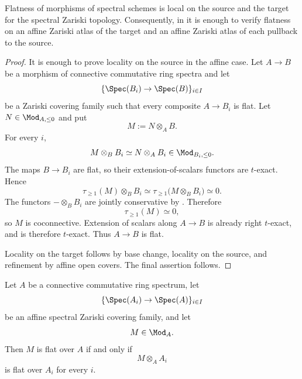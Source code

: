 \begin{proposition}
\label{prop:global-flatness-zariski-local}
Flatness of morphisms of spectral schemes is local on the source and the
target for the spectral Zariski topology. Consequently, in
 it is enough to verify flatness on
an affine Zariski atlas of the target and an affine Zariski atlas of each
pullback to the source.
\end{proposition}

\begin{proof}
It is enough to prove locality on the source in the affine case. Let
$A\to B$ be a morphism of connective commutative ring spectra and let
\[
    \{\Spec(B_i)\to\Spec(B)\}_{i\in I}
\]
be a Zariski covering family such that every composite $A\to B_i$ is
flat. Let $N\in\Mod_{A,\leq0}$ and put
\[
    M
    :=
    N\otimes_AB.
\]
For every $i$,
\[
    M\otimes_BB_i
    \simeq
    N\otimes_AB_i
    \in
    \Mod_{B_i,\leq0}.
\]
The maps $B\to B_i$ are flat, so their extension-of-scalars functors are
$t$-exact. Hence
\[
    \tau_{\geq1}(M)\otimes_BB_i
    \simeq
    \tau_{\geq1}
    \bigl(
        M\otimes_BB_i
    \bigr)
    \simeq
    0.
\]
The functors $-\otimes_BB_i$ are jointly conservative by
. Therefore
\[
    \tau_{\geq1}(M)
    \simeq
    0,
\]
so $M$ is coconnective. Extension of scalars along $A\to B$ is already
right $t$-exact, and is therefore $t$-exact. Thus $A\to B$ is flat.

Locality on the target follows by base change, locality on the source,
and refinement by affine open covers. The final assertion follows.
\end{proof}

\begin{proposition}
\label{prop:flat-module-zariski-local}
Let \(A\) be a connective commutative ring spectrum, let
\[
    \{\Spec(A_i)\to\Spec(A)\}_{i\in I}
\]
be an affine spectral Zariski covering family, and let
\[
    M
    \in
    \Mod_A.
\]
Then \(M\) is flat over \(A\) if and only if
\[
    M\otimes_AA_i
\]
is flat over \(A_i\) for every \(i\).
\end{proposition}

